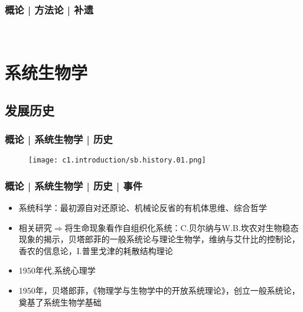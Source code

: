 \begin{frame}
  \frametitle{概论 | 方法论 | 补遗}
  \begin{figure}
    \centering
    \qquad
    \\
    \vspace{1em}
  \end{figure}
\end{frame}

\section{系统生物学}
\subsection{发展历史}
\begin{frame}
  \frametitle{概论 | 系统生物学 | 历史}
  \begin{figure}
    \centering
    \texttt{[image: c1.introduction/sb.history.01.png]}
  \end{figure}
\end{frame}

\begin{frame}
  \frametitle{概论 | 系统生物学 | 历史 | 事件}
  \begin{itemize}
    \item 系统科学：最初源自对还原论、机械论反省的有机体思维、综合哲学
    \item 相关研究$\Rightarrow$将生命现象看作自组织化系统：C.贝尔纳与W.B.坎农对生物稳态现象的揭示，贝塔郎菲的一般系统论与理论生物学，维纳与艾什比的控制论，香农的信息论，I.普里戈津的耗散结构理论
    \item 1950年代,系统心理学
    \item 1950年，贝塔郎菲，《物理学与生物学中的开放系统理论》，创立一般系统论，奠基了系统生物学基础
  \end{itemize}
\end{frame}

